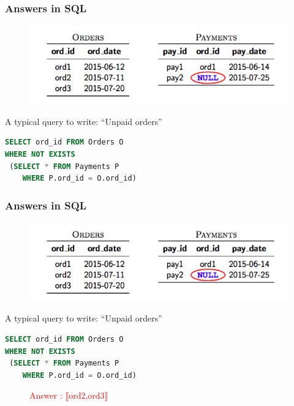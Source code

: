 \documentclass{beamer}
\begin{document}
		\begin{frame}[containsverbatim]
			\frametitle{Answers in  SQL}
			\begin{figure}
					\includegraphics[scale=0.5]{db}
			\end{figure}
			A typical query to write: “Unpaid orders”
			\begin{lstlisting}[language=SQL]
SELECT ord_id FROM Orders O
WHERE NOT EXISTS  
 (SELECT * FROM Payments P 
	WHERE P.ord_id = O.ord_id)
			\end{lstlisting}
			\bigskip
		\end{frame}
		
		\begin{frame}[containsverbatim]
			\frametitle{Answers in  SQL}
			\begin{figure}
				\includegraphics[scale=0.5]{db}
			\end{figure}
			A typical query to write: “Unpaid orders”
			\begin{lstlisting}[language=SQL]
SELECT ord_id FROM Orders O
WHERE NOT EXISTS  
 (SELECT * FROM Payments P 
	WHERE P.ord_id = O.ord_id)
			\end{lstlisting}
			\begin{figure}
				\textcolor{red}{Answer : $\llbracket$ord2,ord3$\rrbracket$}
			\end{figure}
		\end{frame}
		
\end{document}
